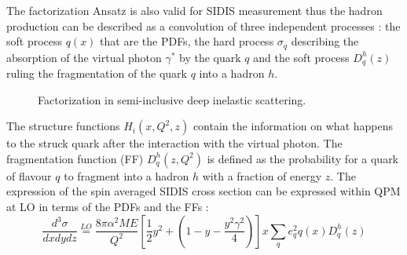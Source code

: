 The factorization Ansatz is also valid for SIDIS measurement thus the hadron production can be described as a convolution of three independent processes : the soft process $q(x)$ that are the PDFs, the hard process $\sigma_q$ describing the absorption of the virtual photon $\gamma^*$ by the quark $q$ and the soft process $D_q^h(z)$ ruling the fragmentation of the quark $q$ into a hadron $h$.

\begin{figure}[!h]
  \centering
	\caption{Factorization in semi-inclusive deep inelastic scattering.}
	\label{pic:SIDIS}
\end{figure}

The structure functions $H_i(x,Q^2,z)$ contain the information on what happens to the struck quark after the interaction with the virtual photon. The fragmentation function (FF) $D_q^h(z,Q^2)$ is defined as the probability for a quark of flavour $q$ to fragment into a hadron $h$ with a fraction of energy $z$. The expression of the spin averaged SIDIS cross section can be expressed within QPM at LO in terms of the PDFs and the FFs \cite{BERGER,Panknin} :
%
\begin{equation}
  \frac{d^3 \sigma}{dxdydz} \stackrel{LO}{=} \frac{8\pi\alpha^2ME}{Q^2}\left[\frac{1}{2}y^2+\left(1-y-\frac{y^2 \gamma^2}{4}\right)\right]x\sum\limits_qe^2_qq(x)D_q^h(z)
  \label{eq:unpolSIDIS}
\end{equation}

